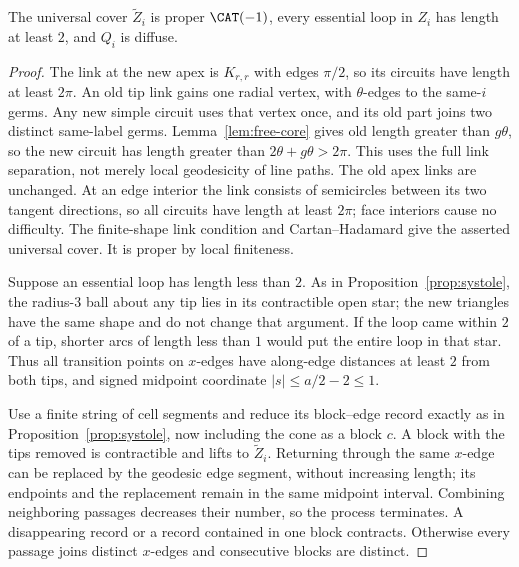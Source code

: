 \begin{lemma}\label{lem:cone-systole}
The universal cover \(\widetilde Z_i\) is proper \(\CAT(-1)\), every
essential loop in \(Z_i\) has length at least \(2\), and \(Q_i\) is
diffuse.
\end{lemma}
\begin{proof}
The link at the new apex is \(K_{r,r}\) with edges \(\pi/2\), so its
circuits have length at least \(2\pi\). An old tip link gains one
radial vertex, with \(\theta\)-edges to the same-\(i\) germs.
Any new simple circuit uses that vertex once, and its old part joins
two distinct same-label germs. Lemma~\ref{lem:free-core} gives old
length greater than \(g\theta\), so the new circuit has length greater
than \(2\theta+g\theta>2\pi\). This uses the full link separation,
not merely local geodesicity of line paths. The old apex links are
unchanged. At an edge interior the link consists of semicircles
between its two tangent directions, so all circuits have length at
least \(2\pi\); face interiors cause no difficulty. The finite-shape
link condition and Cartan--Hadamard
\cite[Theorems~I.7.50, II.5.2 and II.4.1(2), Lemma~II.5.6]{BH}
give the asserted universal cover. It is proper by local finiteness.

Suppose an essential loop has length less than \(2\). As in
Proposition~\ref{prop:systole}, the radius-\(3\) ball about any tip
lies in its contractible open star; the new triangles have the same
shape and do not change that argument. If the loop came within
\(2\) of a tip, shorter arcs of length less than \(1\) would put the
entire loop in that star. Thus all transition points on \(x\)-edges
have along-edge distances at least \(2\) from both tips, and signed
midpoint coordinate \(|s|\le a/2-2\le1\).

Use a finite string of cell segments and reduce its block--edge record
exactly as in Proposition~\ref{prop:systole}, now including the cone
as a block \(c\). A block with the tips removed is contractible and
lifts to \(\widetilde Z_i\). Returning through the same \(x\)-edge
can be replaced by the geodesic edge segment, without increasing
length; its endpoints and the replacement remain in the same
midpoint interval. Combining neighboring passages decreases their
number, so the process terminates. A disappearing record or a record
contained in one block contracts. Otherwise every passage joins
distinct \(x\)-edges and consecutive blocks are distinct.


\end{proof}
